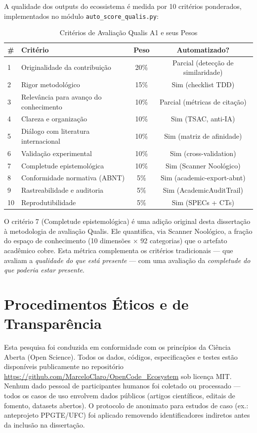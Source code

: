 A qualidade dos outputs do ecossistema é medida por 10 critérios ponderados, implementados no módulo \texttt{auto\_score\_qualis.py}:

\begin{table}[H]
\centering
\caption{Critérios de Avaliação Qualis A1 e seus Pesos}
\begin{tabular}{p{0.5cm}p{6cm}cc}
\toprule
\textbf{\#} & \textbf{Critério} & \textbf{Peso} & \textbf{Automatizado?} \\
\midrule
1 & Originalidade da contribuição & 20\% & Parcial (detecção de similaridade) \\
2 & Rigor metodológico & 15\% & Sim (checklist TDD) \\
3 & Relevância para avanço do conhecimento & 10\% & Parcial (métricas de citação) \\
4 & Clareza e organização & 10\% & Sim (TSAC, anti-IA) \\
5 & Diálogo com literatura internacional & 10\% & Sim (matriz de afinidade) \\
6 & Validação experimental & 10\% & Sim (cross-validation) \\
7 & Completude epistemológica & 10\% & Sim (Scanner Noológico) \\
8 & Conformidade normativa (ABNT) & 5\% & Sim (academic-export-abnt) \\
9 & Rastreabilidade e auditoria & 5\% & Sim (AcademicAuditTrail) \\
10 & Reprodutibilidade & 5\% & Sim (SPECs + CTs) \\
\bottomrule
\end{tabular}
\end{table}

O critério 7 (Completude epistemológica) é uma adição original desta dissertação à metodologia de avaliação Qualis. Ele quantifica, via Scanner Noológico, a fração do espaço de conhecimento (10 dimensões $\times$ 92 categorias) que o artefato acadêmico cobre. Esta métrica complementa os critérios tradicionais --- que avaliam a \textit{qualidade do que está presente} --- com uma avaliação da \textit{completude do que poderia estar presente}.

\section{Procedimentos Éticos e de Transparência}

Esta pesquisa foi conduzida em conformidade com os princípios da Ciência Aberta (Open Science). Todos os dados, códigos, especificações e testes estão disponíveis publicamente no repositório \url{https://github.com/MarceloClaro/OpenCode_Ecosystem} sob licença MIT. Nenhum dado pessoal de participantes humanos foi coletado ou processado --- todos os casos de uso envolvem dados públicos (artigos científicos, editais de fomento, datasets abertos). O protocolo de anonimato para estudos de caso (ex.: anteprojeto PPGTE/UFC) foi aplicado removendo identificadores indiretos antes da inclusão na dissertação.

